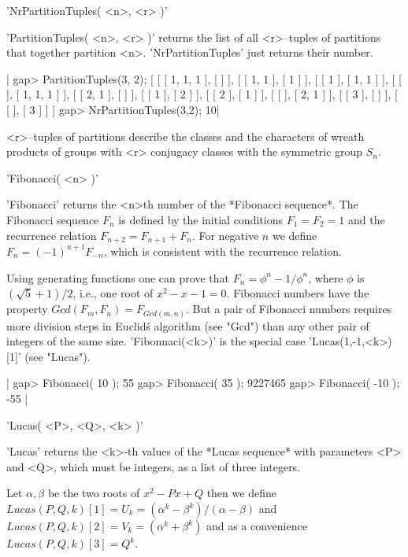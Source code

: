'NrPartitionTuples( <n>, <r> )'

'PartitionTuples(  <n>,  <r>  )'  returns  the  list  of all <r>--tuples of
partitions  that together  partition <n>.  'NrPartitionTuples' just returns
their number.

|    gap> PartitionTuples(3, 2);
    [ [ [ 1, 1, 1 ], [  ] ], [ [ 1, 1 ], [ 1 ] ], [ [ 1 ], [ 1, 1 ] ],
      [ [  ], [ 1, 1, 1 ] ], [ [ 2, 1 ], [  ] ], [ [ 1 ], [ 2 ] ],
      [ [ 2 ], [ 1 ] ], [ [  ], [ 2, 1 ] ], [ [ 3 ], [  ] ],
      [ [  ], [ 3 ] ] ]
    gap> NrPartitionTuples(3,2);
    10|

<r>--tuples  of partitions describe the  classes  and  the  characters of
wreath products of groups with  <r> conjugacy classes with the  symmetric
group $S_n$.

%

'Fibonacci( <n> )'

'Fibonacci'  returns  the <n>th number  of the *Fibonacci sequence*.  The
Fibonacci sequence $F_n$ is defined by the initial conditions $F_1=F_2=1$
and  the recurrence relation  $F_{n+2} = F_{n+1}  + F_{n}$.  For negative
$n$  we  define $F_n = (-1)^{n+1}  F_{-n}$, which  is consistent with the
recurrence relation.

Using generating functions one can prove that $F_n = \phi^n  - 1/\phi^n$,
where  $\phi$ is $(\sqrt{5} + 1)/2$, i.e., one root of $x^2 - x - 1 = 0$.
Fibonacci  numbers have  the  property $Gcd( F_m,  F_n ) = F_{Gcd(m,n)}$.
But a pair of Fibonacci numbers requires more division steps in Euclid\'s
algorithm (see "Gcd") than any  other  pair of integers of the same size.
'Fibonnaci(<k>)' is the special case 'Lucas(1,-1,<k>)[1]' (see "Lucas").

|    gap> Fibonacci( 10 );
    55
    gap> Fibonacci( 35 );
    9227465
    gap> Fibonacci( -10 );
    -55 |

%

'Lucas( <P>, <Q>, <k> )'

'Lucas' returns the <k>-th values of the *Lucas sequence* with parameters
<P> and <Q>, which must be integers, as a list of three integers.

Let $\alpha, \beta$ be the two roots of  $x^2 - P x + Q$  then we  define\\
$Lucas( P, Q, k )[1] = U_k = (\alpha^k - \beta^k) / (\alpha - \beta)$ and\\
$Lucas( P, Q, k )[2] = V_k = (\alpha^k + \beta^k)$  and as  a convenience\\
$Lucas( P, Q, k )[3] = Q^k$.

